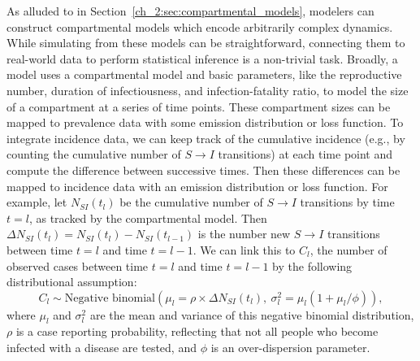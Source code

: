 As alluded to in Section~\ref{ch_2:sec:compartmental_models}, modelers can construct compartmental models which encode arbitrarily complex dynamics.
While simulating from these models can be straightforward, connecting them to real-world data to perform statistical inference is a non-trivial task.
Broadly, a model uses a compartmental model and basic parameters, like the reproductive number, duration of infectiousness, and infection-fatality ratio, to model the size of a compartment at a series of time points.
These compartment sizes can be mapped to prevalence data with some emission distribution or loss function.
To integrate incidence data, we can keep track of the cumulative incidence (e.g., by counting the cumulative number of \( S \to I \) transitions) at each time point and compute the difference between successive times.
Then these differences can be mapped to incidence data with an emission distribution or loss function.
For example, let \( N_{S I}(t_l) \) be the cumulative number of \( S \to I \) transitions by time \( t = l \), as tracked by the compartmental model.
Then \( \Delta N_{S I}(t_l) = N_{S I}(t_l) - N_{S I}(t_{l-1}) \) is the number new \( S \to I \) transitions between time \( t = l \) and time \( t = l - 1 \).
We can link this to \( C_l \), the number of observed cases between time \( t = l \) and time \( t = l - 1 \) by the following distributional assumption:
\begin{equation}
C_l \sim \text{Negative binomial}\left (\mu_l =  \rho \times \Delta N_{S I}(t_l),\ {\sigma^2_l} = \mu_l (1 + \mu_l / \phi )\right ),
\label{ch_2:eqn:example_case_emission}
\end{equation}
where \( \mu_l \) and \( \sigma^2_l \) are the mean and variance of this negative binomial distribution, \( \rho \) is a case reporting probability, reflecting that not all people who become infected with a disease are tested, and \( \phi \) is an over-dispersion parameter.

